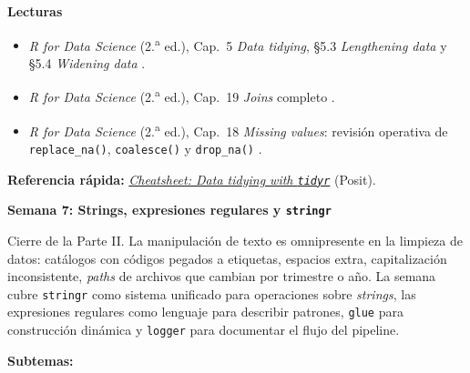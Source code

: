 \documentclass[11pt,letterpaper]{article}
\newcommand{\semana}[2]{%
  \bigskip%
  {\color{main}\Large\bfseries Semana #1: #2\par}%
  \smallskip%
}
\newcommand{\cheatsheet}[2]{%
  \href{https://rstudio.github.io/cheatsheets/#1.pdf}{\textit{Cheatsheet: #2}}%
}
\begin{document}
\medskip
\noindent\textbf{Lecturas}
\begin{itemize}[leftmargin=*, itemsep=1pt]
    \item \textit{R for Data Science} (2.\textsuperscript{a} ed.), Cap.\ 5 \textit{Data tidying}, §5.3 \textit{Lengthening data} y §5.4 \textit{Widening data} \cite{wickham2023r4ds}.
    \item \textit{R for Data Science} (2.\textsuperscript{a} ed.), Cap.\ 19 \textit{Joins} completo \cite{wickham2023r4ds}.
    \item \textit{R for Data Science} (2.\textsuperscript{a} ed.), Cap.\ 18 \textit{Missing values}: revisión operativa de \texttt{replace\_na()}, \texttt{coalesce()} y \texttt{drop\_na()} \cite{wickham2023r4ds}.
\end{itemize}

\medskip
\noindent\textbf{Referencia rápida:} \cheatsheet{tidyr}{Data tidying with \texttt{tidyr}} (Posit).

\semana{7}{Strings, expresiones regulares y \texttt{stringr}}

Cierre de la Parte II. La manipulación de texto es omnipresente en la limpieza de datos: catálogos con códigos pegados a etiquetas, espacios extra, capitalización inconsistente, \textit{paths} de archivos que cambian por trimestre o año. La semana cubre \texttt{stringr} como sistema unificado para operaciones sobre \textit{strings}, las expresiones regulares como lenguaje para describir patrones, \texttt{glue} para construcción dinámica y \texttt{logger} para documentar el flujo del pipeline.

\textbf{Subtemas:}
\end{document}
